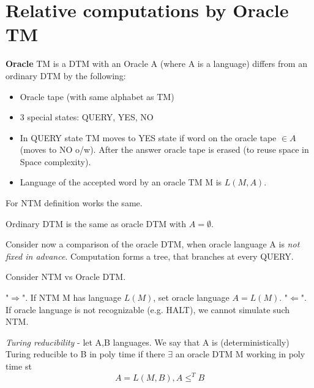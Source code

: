 \section{\texorpdfstring{Relative computations by Oracle TM}{Relative computations by Oracle TM}}
\vspace{5mm}
\large

\begin{definition}[Oracle TM]
	\textbf{Oracle} TM is a DTM with an Oracle A (where A is a language) differs from an ordinary DTM by the following:
	\begin{itemize}
		\item Oracle tape (with same alphabet as TM)
		\item 3 special states: QUERY, YES, NO
		\item In QUERY state TM moves to YES state if word on the oracle tape $\in A$ (moves to NO o/w).
			After the answer oracle tape is erased (to reuse space in Space complexity).
		\item Language of the accepted word by an oracle TM M is $L(M, A)$.
	\end{itemize}
\end{definition}

\begin{note}
	For NTM definition works the same.
\end{note}

\begin{note}
	Ordinary DTM is the same as oracle DTM with $A = \emptyset$.
\end{note}

Consider now a comparison of the oracle DTM, when oracle language A is \emph{not fixed in advance}.
Computation forms a tree, that branches at every QUERY.

\begin{observation}
	Consider NTM vs Oracle DTM.

	"$\Rightarrow$". If NTM M has language $L(M)$, set oracle language $A = L(M)$.
	"$\Leftarrow$". If oracle language is not recognizable (e.g. HALT), we cannot simulate such NTM.
\end{observation}

\begin{definition}
	\emph{Turing reducibility} - let A,B languages.
	We say that A is (deterministically) Turing reducible to B in poly time if there $\exists$ an oracle DTM M working in poly time st
	\[ A = L(M, B), A \leq^T B \]
\end{definition}

